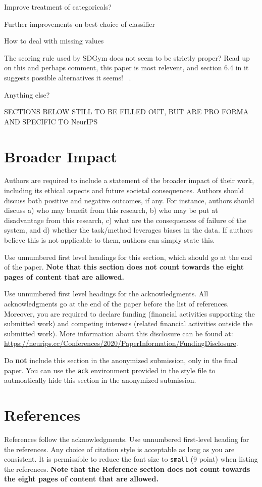 \documentclass{article}
\begin{document}
Improve treatment of categoricals?  

Further improvements on best choice of classifier  

How to deal with missing values  

The scoring rule used by SDGym does not seem to be strictly proper? Read up on this and perhaps comment, this paper is most relevent, and section 6.4 in it suggests possible alternatives it seems! ~\cite{gneiting2007strictly}.

Anything else?   

\newpage
SECTIONS BELOW STILL TO BE FILLED OUT, BUT ARE PRO FORMA AND SPECIFIC TO NeurIPS


\section*{Broader Impact}

Authors are required to include a statement of the broader impact of their work, including its ethical aspects and future societal consequences. 
Authors should discuss both positive and negative outcomes, if any. For instance, authors should discuss a) 
who may benefit from this research, b) who may be put at disadvantage from this research, c) what are the consequences of failure of the system, and d) whether the task/method leverages
biases in the data. If authors believe this is not applicable to them, authors can simply state this.

Use unnumbered first level headings for this section, which should go at the end of the paper. {\bf Note that this section does not count towards the eight pages of content that are allowed.}

\begin{ack}
Use unnumbered first level headings for the acknowledgments. All acknowledgments
go at the end of the paper before the list of references. Moreover, you are required to declare 
funding (financial activities supporting the submitted work) and competing interests (related financial activities outside the submitted work). 
More information about this disclosure can be found at: \url{https://neurips.cc/Conferences/2020/PaperInformation/FundingDisclosure}.


Do {\bf not} include this section in the anonymized submission, only in the final paper. You can use the \texttt{ack} environment provided in the style file to autmoatically hide this section in the anonymized submission.
\end{ack}

\section*{References}

References follow the acknowledgments. Use unnumbered first-level heading for
the references. Any choice of citation style is acceptable as long as you are
consistent. It is permissible to reduce the font size to \verb+small+ (9 point)
when listing the references.
{\bf Note that the Reference section does not count towards the eight pages of content that are allowed.}
\medskip


\end{document}
